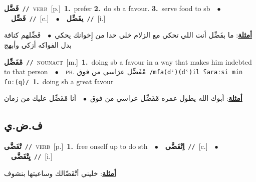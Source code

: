 \documentclass[10pt,a4paper,twoside]{article} %
\begin{document}
\begin{multicols}{2}
{\setlength\topsep{0pt}\textbf{\foreignlanguage{arabic}{فَضَّل}}\ {\color{gray}\texttt{//}\color{black}}\ \textsc{verb}\ [p.]\ \textbf{1.}~prefer  \textbf{2.}~do sb a favour.  \textbf{3.}~serve food to sb\ \ $\bullet$\ \ \setlength\topsep{0pt}\textbf{\foreignlanguage{arabic}{فَضِّل}}\ {\color{gray}\texttt{//}\color{black}}\ [c.]\ \ $\bullet$\ \ \setlength\topsep{0pt}\textbf{\foreignlanguage{arabic}{يفَضِّل}}\ {\color{gray}\texttt{//}\color{black}}\ [i.]\  \begin{flushright}\color{gray}\foreignlanguage{arabic}{\textbf{\underline{\foreignlanguage{arabic}{أمثلة}}}: ما بفَضِّل أنت اللي تحكي مع الزلام خلي حدا من إِخوانك يحكي\ $\bullet$\ \  فَضِّلهم كنافة بدل الفواكه أزكى وأبهج}\end{flushright}\color{black}} \vspace{2mm}

{\setlength\topsep{0pt}\textbf{\foreignlanguage{arabic}{مْفَضِّل}}\ {\color{gray}\texttt{//}\color{black}}\ \textsc{noun\textunderscore act}\ [m.]\ \textbf{1.}~doing sb a favour in a way that makes him indebted to that person\ \ $\bullet$\ \ \textsc{ph.} \color{gray} \foreignlanguage{arabic}{مْفَضِّل عرَاسي من فوق}\color{black}\ {\color{gray}\texttt{/{\sffamily mfa(dˤ)(dˤ)il ʕaraːsi min foː(q)}/}\color{black}}\ \textbf{1.}~doing sb a great favour\  \begin{flushright}\color{gray}\foreignlanguage{arabic}{\textbf{\underline{\foreignlanguage{arabic}{أمثلة}}}: أبوك الله يطول عمره مْفَضِّل عراسي من فوق\ $\bullet$\ \  أنا مْفَضِّل عليك من زمان}\end{flushright}\color{black}} \vspace{2mm}

\vspace{-3mm}
\subsection*{\color{blue}\foreignlanguage{arabic}{ف.ض.ي}\color{blue}{}} 

{\setlength\topsep{0pt}\textbf{\foreignlanguage{arabic}{تْفَضَّى}}\ {\color{gray}\texttt{//}\color{black}}\ \textsc{verb}\ [p.]\ \textbf{1.}~free onself up to do sth\ \ $\bullet$\ \ \setlength\topsep{0pt}\textbf{\foreignlanguage{arabic}{اِتْفَضَّى}}\ {\color{gray}\texttt{//}\color{black}}\ [c.]\ \ $\bullet$\ \ \setlength\topsep{0pt}\textbf{\foreignlanguage{arabic}{يِتْفَضَّى}}\ {\color{gray}\texttt{//}\color{black}}\ [i.]\  \begin{flushright}\color{gray}\foreignlanguage{arabic}{\textbf{\underline{\foreignlanguage{arabic}{أمثلة}}}: خليني أتْفَضّالك وساعيتها بنشوف}\end{flushright}\color{black}} \vspace{2mm}


\end{multicols}
\end{document}
